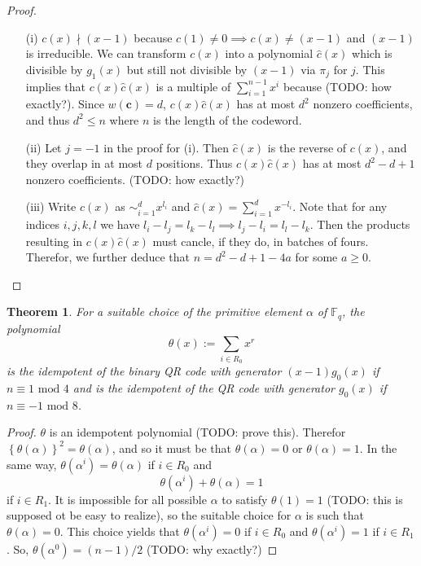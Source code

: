 \documentclass{article}
\newcommand{\F}{\mathbb{F}}
\renewcommand{\mod}{\text{ mod }}
\newcommand{\mt}{\mapsto}
\renewcommand{\=}{\equiv}
\renewcommand{\i}{^{-1}}
\newcommand{\set}[1]{\left\{ #1 \right\}}
\renewcommand{\v}{\mathbf}
\theoremstyle{plain}
\newtheorem{thm}{Theorem}[subsection]
\theoremstyle{definition}
\newcommand{\TODO}[1]{(TODO: #1)}
\begin{document}
\begin{proof}
\hspace{0em}
\begin{enumerate}
  \item[(i)]
  $c(x) \nmid (x-1)$ because $c(1) \neq 0 \implies c(x) \neq (x-1)$ and $(x-1)$ is irreducible.
  We can transform $c(x)$ into a polynomial $\hat c(x)$ which is divisible by $g_1(x)$ but still not divisible by $(x-1)$
  via $\pi_j$ for $j$.
  This implies that $c(x) \hat c(x)$ is a multiple of $\sum_{i=1}^{n-1} x^i$ because \TODO{how exactly?}.
  Since $w(\v c) = d$, $c(x) \hat c(x)$ has at most $d^2$ nonzero coefficients, and thus $d^2 \leq n$ where $n$ is the length of the codeword.

  \item[(ii)]
  Let $j = -1$ in the proof for (i). Then $\hat c(x)$ is the reverse of $c(x)$, and they overlap in at most $d$ positions.
  Thus $c(x) \hat c(x)$ has at most $d^2 - d + 1$ nonzero coefficients. \TODO{how exactly?}

  \item[(iii)]
  Write $c(x)$ as $\sim_{i=1}^d x^{l_i}$ and $\hat c(x) = \sum_{i=1}^d x^{-l_i}$.
  Note that for any indices $i,j,k,l$ we have $l_i - l_j = l_k - l_l \implies l_j - l_i = l_l - l_k$.
  Then the products resulting in $c(x) \hat c(x)$ must cancle, if they do, in batches of fours.
  Therefor, we further deduce that $n = d^2 - d + 1 - 4a$ for some $a \geq 0$.
\end{enumerate}
\end{proof}

\begin{thm}
  \label{thm:suitable-theta}
  For a suitable choice of the primitive element $\alpha$ of $\F_q$, the polynomial
  $$ \theta(x) := \sum_{i \in R_0} x^r $$
  is the idempotent of the binary QR code with generator $(x-1) g_0(x)$ if $n \= 1 \mod 4$
  and is the idempotent of the QR code with generator $g_0(x)$ if $n \= -1 \mod 8$.
\end{thm}
\begin{proof}
$\theta$ is an idempotent polynomial \TODO{prove this}.
Therefor $\set{\theta(\alpha)}^2 = \theta(\alpha)$, and so it must be that $\theta(\alpha) = 0$ or $\theta(\alpha) = 1$.
In the same way, $\theta(\alpha^i) = \theta(\alpha)$ if $i \in R_0$ and
$$ \theta(\alpha^i) + \theta(\alpha) = 1 $$
if $i \in R_1$.
It is impossible for all possible $\alpha$ to satisfy $\theta(1) = 1$ \TODO{this is supposed ot be easy to realize}, so the suitable choice for $\alpha$ is such that $\theta(\alpha) = 0$.
This choice yields that $\theta(\alpha^i) = 0$ if $i \in R_0$ and $\theta(\alpha^i) = 1$ if $i \in R_1$.
So, $\theta(\alpha^0) = (n-1)/2$ \TODO{why exactly?}
\end{proof}
\end{document}
